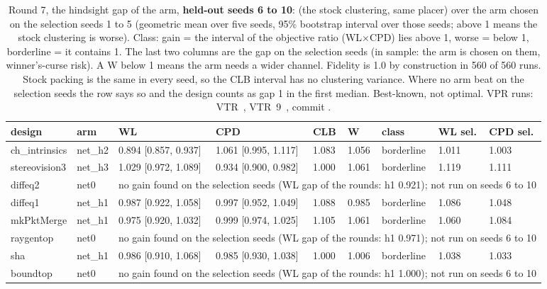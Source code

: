\begin{table}[t]
\caption{Round 7, the hindsight gap of the  arm, \textbf{held-out seeds 6 to 10}:  (the stock clustering, same placer) over the arm chosen on the selection seeds 1 to 5 (geometric mean over five seeds, 95\% bootstrap interval over those seeds; above 1 means the stock clustering is worse). Class: gain = the interval of the objective ratio (WL$\times$CPD) lies above 1, worse = below 1, borderline = it contains 1. The last two columns are the gap on the selection seeds (in sample: the arm is chosen on them, winner's-curse risk). A W below 1 means the arm needs a wider channel. Fidelity is 1.0 by construction in 560 of 560 runs. Stock packing is the same in every seed, so the CLB interval has no clustering variance. Where no arm beat  on the selection seeds the row says so and the design counts as gap 1 in the first median. Best-known, not optimal. VPR runs: VTR~\cite{rose2012vtr}, VTR~9~\cite{elgammal2025vtr9}, commit .}
\label{tab:r7gap}
\centering\scriptsize
\setlength{\tabcolsep}{3pt}
\begin{tabular}{@{}lllllllll@{}}
\toprule
design & arm & WL & CPD & CLB & W & class & WL sel. & CPD sel. \\
\midrule
ch\_intrinsics & net\_h2 & 0.894 [0.857, 0.937] & 1.061 [0.995, 1.117] & 1.083 & 1.056 & borderline & 1.011 & 1.003 \\
stereovision3 & net\_h3 & 1.029 [0.972, 1.089] & 0.934 [0.900, 0.982] & 1.000 & 1.061 & borderline & 1.119 & 1.111 \\
diffeq2 & net0 & \multicolumn{7}{l}{no gain found on the selection seeds (WL gap of the rounds: h1 0.921); not run on seeds 6 to 10} \\
diffeq1 & net\_h1 & 0.987 [0.922, 1.058] & 0.997 [0.952, 1.049] & 1.088 & 0.985 & borderline & 1.086 & 1.048 \\
mkPktMerge & net\_h1 & 0.975 [0.920, 1.032] & 0.999 [0.974, 1.025] & 1.105 & 1.061 & borderline & 1.060 & 1.084 \\
raygentop & net0 & \multicolumn{7}{l}{no gain found on the selection seeds (WL gap of the rounds: h1 0.971); not run on seeds 6 to 10} \\
sha & net\_h1 & 0.986 [0.910, 1.068] & 0.985 [0.930, 1.038] & 1.000 & 1.006 & borderline & 1.038 & 1.033 \\
boundtop & net0 & \multicolumn{7}{l}{no gain found on the selection seeds (WL gap of the rounds: h1 1.000); not run on seeds 6 to 10} \\

\end{tabular}
\end{table}
